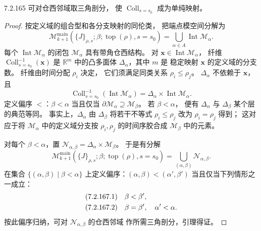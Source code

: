 \begin{lemma}{7.2.165}\label{lem:7-2-165}
可对仓西邻域取三角剖分，
使 $\operatorname{Coll}_{s=s_0}$ 成为单纯映射。
\end{lemma}
\begin{proof}
按定义域的组合型和各分支映射的同伦类，
把端点模空间分解为
\[
\mathcal M_{k+1}^{\mathrm{main}}
(\{J\}_{\rho,s};\beta;
\operatorname{top}(\rho),s=s_0)
=\bigcup_{\alpha\in A}\operatorname{Int}\mathcal M_\alpha.
\]
每个 $\operatorname{Int}\mathcal M_\alpha$
的闭包 $\mathcal M_\alpha$ 具有带角仓西结构。
对 $\mathbf x\in\operatorname{Int}\mathcal M_\alpha$，
纤维 $\operatorname{Coll}_{s=s_0}^{-1}(\mathbf x)$
是 $\mathbb R^m$ 中的凸多面体
$\Delta_\alpha$，其中 $m$ 是
稳定映射 $\mathbf x$ 的定义域的分支数。
纤维由时间分配 $\rho_i$ 决定，
它们须满足同类关系 $\rho_i\le\rho_j$。
$\Delta_\alpha$ 不依赖于 $\mathbf x$，且
\[
\operatorname{Coll}_{s=s_0}^{-1}
(\operatorname{Int}\mathcal M_\alpha)
=\Delta_\alpha\times
\operatorname{Int}\mathcal M_\alpha.
\]
定义偏序 $<$：$\beta<\alpha$
当且仅当
$\partial\mathcal M_\alpha\supseteq\mathcal M_\beta$。
若 $\beta<\alpha$，
便有 $\Delta_\alpha$ 与 $\Delta_\beta$
某个层的典范等同。
事实上，$\Delta_\alpha$
由 $\Delta_\beta$ 将若干不等式
$\rho_i\le\rho_j$ 改为
$\rho_i=\rho_j$ 得到；
这对应于将 $\mathcal M_\alpha$
中的定义域分支按 $\rho_i,\rho_j$
的时间序胶合成 $\mathcal M_\beta$
中的元素。

对每个 $\beta<\alpha$，置
$\mathcal N_{\alpha,\beta}
=\Delta_\alpha\times\mathcal M_\beta$。
于是有分解
\begin{equation}
\mathcal M_{k+1}^{\mathrm{main}}
(\{J\}_{\rho,s};\beta;
\operatorname{top}(\rho),s=s_0)
=\bigcup_{(\alpha,\beta)}
\mathcal N_{\alpha,\beta}.
\tag{7.2.166}\label{eq:7-2-166}
\end{equation}
在集合 $\{(\alpha,\beta)\mid\beta<\alpha\}$
上定义偏序：$(\alpha,\beta)<(\alpha',\beta')$
当且仅当下列情形之一成立：
\begin{align*}
\textup{(7.2.167.1)}\quad&\beta<\beta',\\
\textup{(7.2.167.2)}\quad&
\beta=\beta',\quad\alpha'<\alpha.
\end{align*}
按此偏序归纳，可对
$\mathcal N_{\alpha,\beta}$ 的仓西邻域
作所需三角剖分，引理得证。
\end{proof}

